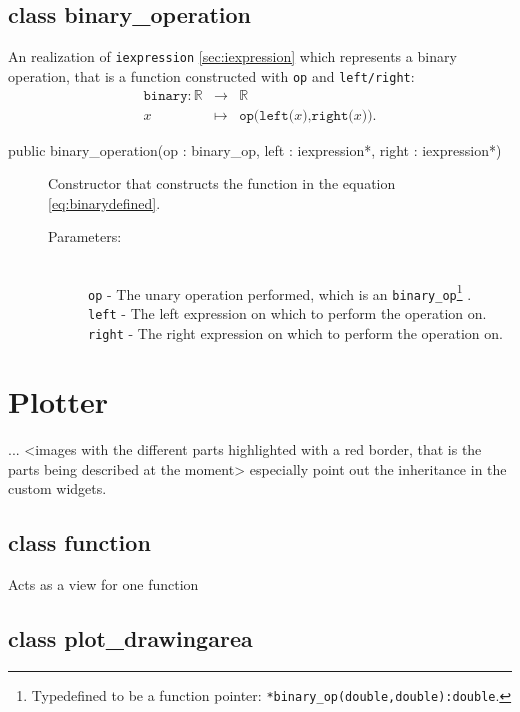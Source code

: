 \documentclass[a4paper,11pt]{kth-mag}
\newcommand{\RR}{\ensuremath{\mathbb{R}}}
\begin{document}
\subsection{class binary\_operation} An realization of \texttt{iexpression}
\ref{sec:iexpression} which represents a binary operation, that is a function
constructed with \texttt{op} and \texttt{left/right}:
\begin{eqnarray}
    \label{eq:binarydefined}
    \texttt{binary}: \RR &\rightarrow& \RR \nonumber \\
    x &\mapsto& \texttt{op(left(}x\texttt{),right(}x\texttt{))}.
\end{eqnarray}
\begin{description}
    \item[public binary\_operation(op : binary\_op, left : iexpression*, right :
    iexpression*)] Constructor that constructs the function in the equation
    \ref{eq:binarydefined}. 
    \begin{description}
        \item[Parameters:]~\\
            \verb+op+ - The unary operation performed, which is an
            \texttt{binary\_op}\footnote{Typedefined to
            be a function pointer: \texttt{*binary\_op(double,double):double}.} .\\
            \verb+left+ - The left expression on which to perform the
            operation on. \\
            \verb+right+ - The right expression on which to perform the
            operation on.
    \end{description}
\end{description}

\section{Plotter}
...
<images with the different parts highlighted with a red border, that is the parts being described at the moment>
especially point out the inheritance in the custom widgets.


\subsection{class function}
Acts as a view for one function

\subsection{class plot\_drawingarea}
\end{document}

